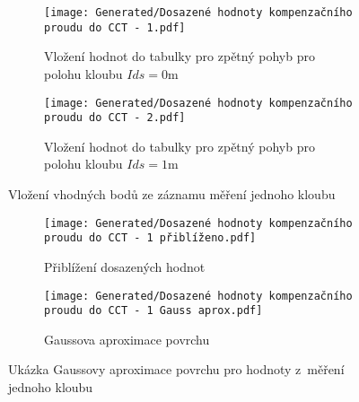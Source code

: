 \begin{landscapeimagepage}
    \begin{figure}[H]
        \centering
        \begin{subfigure}{.5\textheight}
            \centering
            \texttt{[image: Generated/Dosazené hodnoty kompenzačního proudu do CCT - 1.pdf]}
            \caption{Vložení hodnot do tabulky pro zpětný pohyb pro polohu kloubu $Ids = 0 $m}
            \label{fig:Vložení hodnot do tabulky pro zpětný pohyb pro polohu kloubu Ids = 0 m}
        \end{subfigure}
        \hspace{2.5cm}
        \begin{subfigure}{.5\textheight}
            \centering
            \texttt{[image: Generated/Dosazené hodnoty kompenzačního proudu do CCT - 2.pdf]}
            \caption{Vložení hodnot do tabulky pro zpětný pohyb pro polohu kloubu $Ids = 1 $m}
            \label{fig:Vložení hodnot do tabulky pro zpětný pohyb pro polohu kloubu Ids = 1 m}
        \end{subfigure}
        \caption{Vložení vhodných bodů ze záznamu měření jednoho kloubu}
        \label{}
    \end{figure}
    \begin{figure}[H]
        \centering
        \begin{subfigure}{.5\textheight}
            \centering
            \texttt{[image: Generated/Dosazené hodnoty kompenzačního proudu do CCT - 1 přiblíženo.pdf]}
            \caption{Přiblížení dosazených hodnot}
            \label{}
        \end{subfigure}
        \hspace{2.5cm}
        \begin{subfigure}{.5\textheight}
            \centering
            \texttt{[image: Generated/Dosazené hodnoty kompenzačního proudu do CCT - 1 Gauss aprox.pdf]}
            \caption{Gaussova aproximace povrchu}
            \label{}
        \end{subfigure}
        \caption{Ukázka Gaussovy aproximace povrchu pro hodnoty z~měření jednoho kloubu}
        \label{fig: Ukázka aktualizace CCT pomocí hodnot z~měření jednoho kloubu pomocí Gaussovy aproximace}
    \end{figure}
\end{landscapeimagepage}

